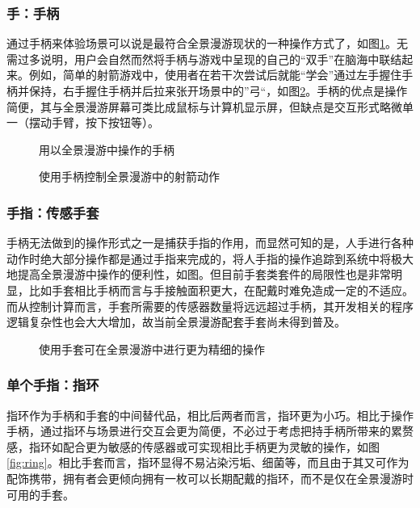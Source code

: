 \subsubsection{手：手柄}
通过手柄来体验场景可以说是最符合全景漫游现状的一种操作方式了，如图\ref{fig:handler}。无需过多说明，用户会自然而然将手柄与游戏中呈现的自己的“双手”在脑海中联结起来。例如，简单的射箭游戏中，使用者在若干次尝试后就能“学会”通过左手握住手柄并保持，右手握住手柄并后拉来张开场景中的”弓“，如图\ref{fig:shoot}。手柄的优点是操作简便，其与全景漫游屏幕可类比成鼠标与计算机显示屏，但缺点是交互形式略微单一（摆动手臂，按下按钮等）。

\begin{figure}[htp]
\centering
{}
\caption{用以全景漫游中操作的手柄}
\label{fig:handler}
\end{figure}

\begin{figure}[htp]
\centering
{}
\caption{使用手柄控制全景漫游中的射箭动作}
\label{fig:shoot}
\end{figure}

\subsubsection{手指：传感手套}
手柄无法做到的操作形式之一是捕获手指的作用，而显然可知的是，人手进行各种动作时绝大部分操作都是通过手指来完成的，将人手指的操作追踪到系统中将极大地提高全景漫游中操作的便利性，如图。但目前手套类套件的局限性也是非常明显，比如手套相比手柄而言与手接触面积更大，在配戴时难免造成一定的不适应。而从控制计算而言，手套所需要的传感器数量将远远超过手柄，其开发相关的程序逻辑复杂性也会大大增加，故当前全景漫游配套手套尚未得到普及。

\begin{figure}[htp]
\centering
{}
\caption{使用手套可在全景漫游中进行更为精细的操作}
\label{fig:gloves}
\end{figure}

\subsubsection{单个手指：指环}
指环作为手柄和手套的中间替代品，相比后两者而言，指环更为小巧。相比于操作手柄，通过指环与场景进行交互会更为简便，不必过于考虑把持手柄所带来的累赘感，指环如配合更为敏感的传感器或可实现相比手柄更为灵敏的操作，如图\ref{fig:ring}。相比手套而言，指环显得不易沾染污垢、细菌等，而且由于其又可作为配饰携带，拥有者会更倾向拥有一枚可以长期配戴的指环，而不是仅在全景漫游时可用的手套。


